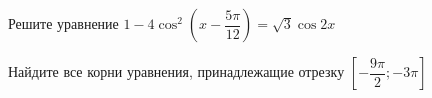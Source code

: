 \begin{ex}
	\begin{condition}
		\begin{enumcols}[label=\asbuk*)]
			\item Решите уравнение \( 1 -4\cos^2{\left( x - \dfrac{5\pi}{12}\right)}=\sqrt{3}\cos 2x  \)
			\item Найдите все корни уравнения, принадлежащие отрезку \(  \left[-\dfrac{9\pi}{2};-3\pi\right] \)
		\end{enumcols}
	\end{condition}
\end{ex}